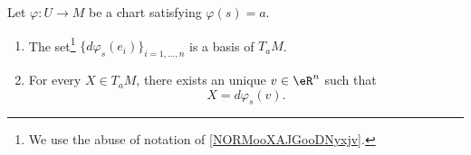 \begin{proposition}     \label{PROPooKMCGooDEuaWz}
	Let \( \varphi\colon U\to M\) be a chart satisfying \( \varphi(s)=a\).
	\begin{enumerate}
		\item       \label{ITEMooSFUBooNXgGuu}
		      The set\footnote{We use the abuse of notation of \ref{NORMooXAJGooDNyxjv}.} \( \{ d\varphi_s(e_i) \}_{i=1,\ldots, n}\) is a basis of \( T_aM\).
		\item       \label{ITEMooPYPVooKkHrkQ}
		      For every \( X\in T_aM\), there exists an unique \( v\in \eR^n\) such that
		      \begin{equation}
			      X=d\varphi_{s}(v).
		      \end{equation}
	\end{enumerate}
\end{proposition}

